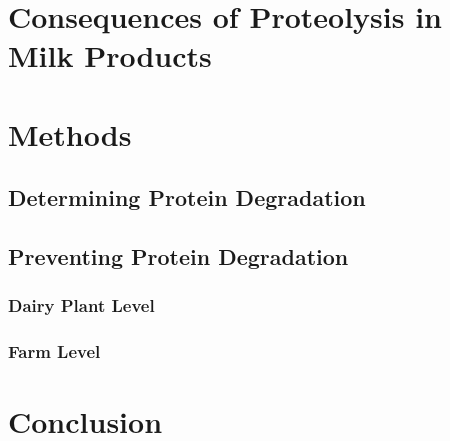 \section{Consequences of Proteolysis in Milk Products}


\section{Methods}

\subsection{Determining Protein Degradation}

\subsection{Preventing Protein Degradation}

\subsubsection{Dairy Plant Level}

\subsubsection{Farm Level}



\section{Conclusion}

